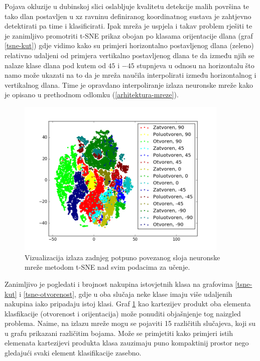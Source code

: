 \documentclass[times, utf8, diplomski, numeric]{fer}
\begin{document}
Pojava okluzije u dubinskoj slici oslabljuje kvalitetu detekcije malih površina te tako dlan postavljen u xz ravninu definiranog koordinatnog sustava je zahtjevno detektirati pa time i klasificirati. Ipak mreža je uspjela i takav problem rješiti te je zanimljivo promotriti t-SNE prikaz obojan po klasama orijentacije dlana (graf \ref{tsne-kut}) gdje vidimo kako su primjeri horizontalno postavljenog dlana (zeleno) relativno udaljeni od primjera vertikalno postavljenog dlana te da između njih se nalaze klase dlana pod kutem od $45$ i $-45$ stupnjeva u odnosu na horizontalu što namo može ukazati na to da je mreža naučila interpolirati između horizontalnog i vertikalnog dlana. Time je opravdano interpoliranje izlaza neuronske mreže kako je opisano u prethodnom odlomku (\ref{arhitektura-mreze}).


\begin{figure}[h!]
\centering
\includegraphics[width = 0.9\textwidth]{detekcija/train_all}
\caption{Vizualizacija izlaza zadnjeg potpuno povezanog sloja neuronske mreže metodom t-SNE nad svim podacima za učenje.} \label{tsne-all}
\end{figure}

Zanimljivo je pogledati i brojnost nakupina istovjetnih klasa na grafovima \ref{tsne-kut} i \ref{tsne-otvorenost}, gdje u oba slučaja neke klase imaju više udaljenih nakupina iako pripadaju istoj klasi. Graf \ref{tsne-all} kao kartezijev produkt oba elementa klasfikacije (otvorenost i orijentacija) može ponuditi objašnjenje tog naizgled problema. Naime, na izlazu mreže mogu se pojaviti 15 različitih slučajeva, koji su u grafu prikazani različitim bojama. Može se primjetiti kako primjeri istih elemenata kartezijevi produkta klasa zauzimaju puno kompaktinij prostor nego gledajući svaki element klasifikacije zasebno.
\end{document}
